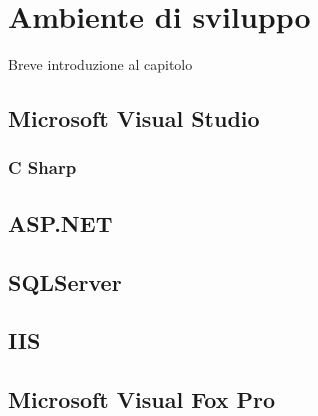 
\chapter{Ambiente di sviluppo}
\label{cap:ambiente-sviluppo}

Breve introduzione al capitolo

\section{Microsoft Visual Studio}

\subsection{C Sharp}

\section{ASP.NET}

\section{SQLServer}

\section{IIS}

\section{Microsoft Visual Fox Pro}
